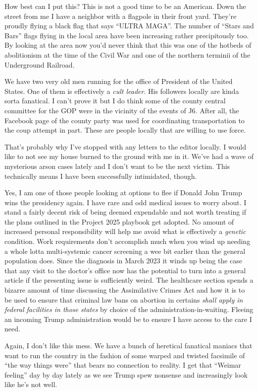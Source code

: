 How best can I put this? This is not a good time to be an American. Down
the street from me I have a neighbor with a flagpole in their front
yard. They're proudly flying a black flag that says ``ULTRA MAGA''. The
number of ``Stars and Bars'' flags flying in the local area have been
increasing rather precipitously too. By looking at the area now you'd
never think that this was one of the hotbeds of abolitionism at the time
of the Civil War and one of the northern terminii of the Underground
Railroad.

We have two very old men running for the office of President of the
United States. One of them is effectively a \emph{cult leader}. His
followers locally are kinda sorta fanatical. I can't prove it but I do
think some of the county central committee for the GOP were in the
vicinity of the events of J6. After all, the Facebook page of the county
party was used for coordinating transportation to the coup attempt in
part. These are people locally that are willing to use force.

That's probably why I've stopped with any letters to the editor locally.
I would like to not see my house burned to the ground with me in it.
We've had a wave of mysterious arson cases lately and I don't want to be
the next victim. This technically means I have been successfully
intimidated, though.

Yes, I am one of those people looking at options to flee if Donald John
Trump wins the presidency again. I have rare and odd medical issues to
worry about. I stand a fairly decent risk of being deemed expendable and
not worth treating if the plans outlined in the Project 2025 playbook
get adopted. No amount of increased personal responsibility will help me
avoid what is effectively a \emph{genetic} condition. Work requirements
don't accomplish much when you wind up needing a whole lotta
multi-systemic cancer screening a wee bit earlier than the general
population does. Since the diagnosis in March 2023 it winds up being the
case that any visit to the doctor's office now has the potential to turn
into a general article if the presenting issue is sufficiently weird.
The healthcare section spends a bizarre amount of time discussing the
Assimilative Crimes Act and how it is to be used to ensure that criminal
law bans on abortion in certains \emph{shall apply in federal facilities
in those states} by choice of the administration-in-waiting. Fleeing an
incoming Trump administration would be to ensure I have access to the
care I need.

Again, I don't like this mess. We have a bunch of heretical fanatical
maniacs that want to run the country in the fashion of some warped and
twisted facsimile of ``the way things were'' that bears no connection to
reality. I get that ``Weimar feeling'' day by day lately as we see Trump
spew nonsense and increasingly look like he's not well.

